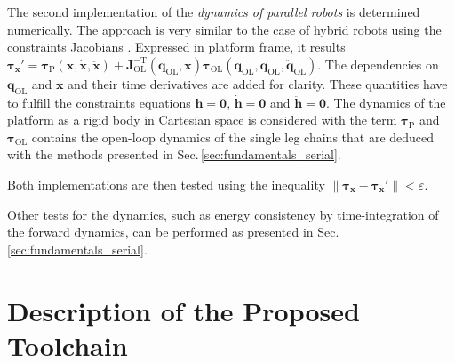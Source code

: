 \documentclass[runningheads]{llncs}
\newcommand{\transp}[0]{{\mathrm{T}}}
\begin{document}
\begin{property}\label{property:par_dyn}
The second implementation of the \emph{dynamics of parallel robots} \cite{DoThanhKotHeiOrt2009b} is determined numerically.
The approach is very similar to the case of hybrid robots using the constraints Jacobians \cite{SaminFis2013,Docquier2013}.
Expressed in platform frame, it results $\bm{\tau}_{\bm{x}}'{=}\bm{\tau}_{\mathrm{P}}(\bm{x},\dot{\bm{x}},\ddot{\bm{x}}){+}\bm{J}^{-\transp}_{\mathrm{OL}}(\bm{q}_{\mathrm{OL}},\bm{x}) \bm{\tau}_{\mathrm{OL}}(\bm{q}_{\mathrm{OL}},\dot{\bm{q}}_{\mathrm{OL}},\ddot{\bm{q}}_{\mathrm{OL}})$.
The dependencies on $\bm{q}_{\mathrm{OL}}$ and $\bm{x}$ and their time derivatives are added for clarity.
These quantities have to fulfill the constraints equations $\bm{h}{=}\bm{0}$, $\dot{\bm{h}}{=}\bm{0}$ and $\ddot{\bm{h}}{=}\bm{0}$.
The dynamics of the platform as a rigid body in Cartesian space is considered with the term $\bm{\tau}_{\mathrm{P}}$ and $\bm{\tau}_{\mathrm{OL}}$ contains the open-loop dynamics of the single leg chains that are deduced with the methods presented in Sec.\,\ref{sec:fundamentals_serial}. 
\end{property}

\begin{test}\label{test:par_dyn}
Both implementations are then tested using the inequality $\lVert\bm{\tau}_{\bm{x}}{-}\bm{\tau}_{\bm{x}}'\rVert {<} \varepsilon$.
\end{test}

Other tests for the dynamics, such as energy consistency by time-integration of the forward dynamics, can be performed as presented in Sec.\,\ref{sec:fundamentals_serial}.

\section{Description of the Proposed Toolchain}
\label{sec:toolchain}
\end{document}
